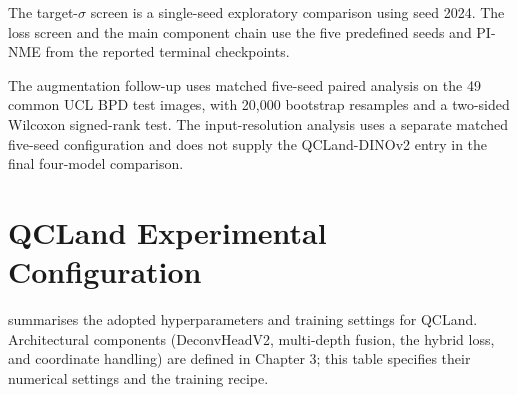 The target-$\sigma$ screen is a single-seed exploratory comparison
using seed 2024. The loss screen and the main component chain use the
five predefined seeds and PI-NME from the reported terminal
checkpoints.

The augmentation follow-up uses matched five-seed paired analysis on
the 49 common UCL BPD test images, with 20{,}000 bootstrap resamples
and a two-sided Wilcoxon signed-rank test. The input-resolution
analysis uses a separate matched five-seed configuration and does not
supply the QCLand-DINOv2 entry in the final four-model comparison.



\section{QCLand Experimental Configuration}
\label{sec:setup-default-config}

 summarises the adopted hyperparameters and
training settings for QCLand. Architectural components
(DeconvHeadV2, multi-depth fusion, the hybrid loss, and coordinate
handling) are defined in Chapter 3; this table specifies their
numerical settings and the training recipe.

